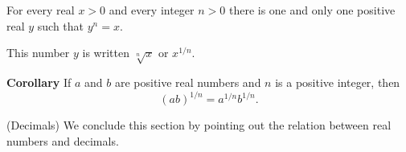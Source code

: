 \begin{thm}\label{thm:1.21}
    For every real $x > 0$ and every integer $n> 0$ there is one and only one positive real $y$ such that $y^n = x$.
\end{thm}

This number $y$ is written $\sqrt[n]{x}$ or $x^{1/n}$.

\textbf{Corollary} If $a$ and $b$ are positive real numbers and $n$ is a positive integer, then
\begin{equation*}
    (ab)^{1/n}= a^{1/n}b^{1/n}.
\end{equation*}

\begin{myDefinition}(Decimals)
    We conclude this section by pointing out the relation between real numbers and decimals.
\end{myDefinition}

